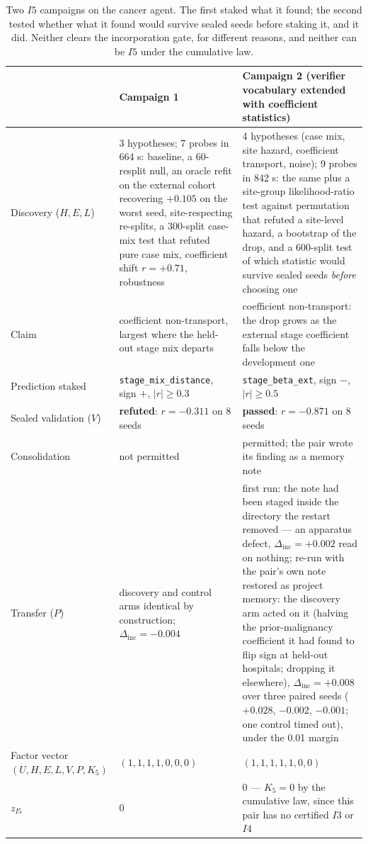 \documentclass[11pt]{article}
\theoremstyle{definition}
\begin{document}
\begin{table}[!htbp]
\centering\small
\begin{tabularx}{\textwidth}{@{}lYY@{}}
\toprule
 & Campaign 1 & Campaign 2 (verifier vocabulary extended with coefficient statistics) \\
\midrule
Discovery ($H, E, L$) & 3 hypotheses; 7 probes in 664 s: baseline, a 60-resplit null, an oracle refit on the external cohort recovering $+0.105$ on the worst seed, site-respecting re-splits, a 300-split case-mix test that refuted pure case mix, coefficient shift $r = +0.71$, robustness & 4 hypotheses (case mix, site hazard, coefficient transport, noise); 9 probes in 842 s: the same plus a site-group likelihood-ratio test against permutation that refuted a site-level hazard, a bootstrap of the drop, and a 600-split test of which statistic would survive sealed seeds \emph{before} choosing one \\
Claim & coefficient non-transport, largest where the held-out stage mix departs & coefficient non-transport: the drop grows as the external stage coefficient falls below the development one \\
Prediction staked & \texttt{stage\_mix\_distance}, sign $+$, $|r| \ge 0.3$ & \texttt{stage\_beta\_ext}, sign $-$, $|r| \ge 0.5$ \\
Sealed validation ($V$) & \textbf{refuted}: $r = -0.311$ on 8 seeds & \textbf{passed}: $r = -0.871$ on 8 seeds \\
Consolidation & not permitted & permitted; the pair wrote its finding as a memory note \\
Transfer ($P$) & discovery and control arms identical by construction; $\Delta_{\mathrm{inc}} = -0.004$ & first run: the note had been staged inside the directory the restart removed --- an apparatus defect, $\Delta_{\mathrm{inc}} = +0.002$ read on nothing; re-run with the pair's own note restored as project memory: the discovery arm acted on it (halving the prior-malignancy coefficient it had found to flip sign at held-out hospitals; dropping it elsewhere), $\Delta_{\mathrm{inc}} = +0.008$ over three paired seeds ($+0.028$, $-0.002$, $-0.001$; one control timed out), under the 0.01 margin \\
Factor vector $(U,H,E,L,V,P,K_5)$ & $(1,1,1,1,0,0,0)$ & $(1,1,1,1,1,0,0)$ \\
$z_{I5}$ & 0 & 0 --- $K_5 = 0$ by the cumulative law, since this pair has no certified $I3$ or $I4$ \\
\bottomrule
\end{tabularx}
\caption{Two $I5$ campaigns on the cancer agent. The first staked what it found; the second tested whether what it found would survive sealed seeds before staking it, and it did. Neither clears the incorporation gate, for different reasons, and neither can be $I5$ under the cumulative law.}
\label{tab:i5}
\end{table}
\end{document}
